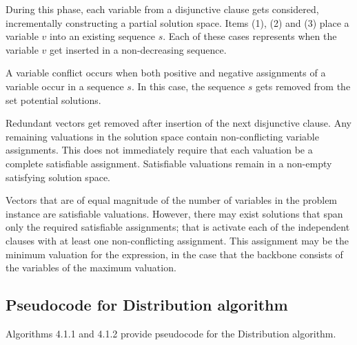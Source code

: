 \FloatBarrier

		
During this phase, each variable from a disjunctive clause gets considered, incrementally constructing a partial solution space.  Items (1), (2) and (3) place a variable $v$ into an existing sequence $s$.  Each of these cases represents when the variable $v$ get inserted in a non-decreasing sequence.

A variable conflict occurs when both positive and negative assignments of a variable occur in a sequence $s$.  In this case, the sequence $s$ gets removed from the set potential solutions.

Redundant vectors get removed after insertion of the next disjunctive clause.  Any remaining valuations in the solution space contain non-conflicting variable assignments.  This does not immediately require that each valuation be a complete satisfiable assignment. Satisfiable valuations remain in a non-empty satisfying solution space.
		
		




Vectors that are of equal magnitude of the number of variables in the problem instance are satisfiable valuations.  However, there may exist solutions that span only the required satisfiable assignments; that is activate each of the independent clauses with at least one non-conflicting assignment.  This assignment may be the minimum valuation for the expression, in the case that the backbone consists of the variables of the maximum valuation.

		
	\subsection{Pseudocode for Distribution algorithm}

Algorithms 4.1.1 and 4.1.2 provide pseudocode for the Distribution algorithm.  





%
%
%	




